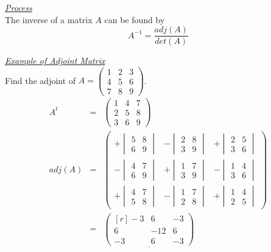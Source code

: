 \documentclass[11pt,a4paper]{article}
\begin{document}
\underline{\textit{Process}}\\
The inverse of a matrix $A$ can be found by
$$A^{-1} = \frac{adj(A)}{det(A)}$$

\textit{\underline{\textit{Example of Adjoint Matrix}}}\\
Find the adjoint of $A = \begin{pmatrix} 1 & 2 & 3 \\ 4 & 5 & 6 \\ 7 & 8 & 9 \end{pmatrix}$.
\[\begin{array}{rcl}
  A^t &=& \begin{pmatrix} 1 & 4 & 7 \\ 2 & 5 & 8 \\ 3 & 6 & 9\end{pmatrix}\\
  adj(A) &=& \begin{pmatrix} +\begin{vmatrix} 5 & 8 \\ 6 & 9 \end{vmatrix} & -\begin{vmatrix} 2 & 8 \\ 3 & 9 \end{vmatrix} & +\begin{vmatrix} 2 & 5 \\ 3 & 6 \end{vmatrix} \\ -\begin{vmatrix} 4 & 7 \\ 6 & 9 \end{vmatrix} & + \begin{vmatrix} 1 & 7 \\ 3 & 9\end{vmatrix} & -\begin{vmatrix} 1 & 4 \\ 3 & 6\end{vmatrix} \\ +\begin{vmatrix} 4 & 7 \\ 5 & 8 \end{vmatrix} & -\begin{vmatrix} 1 & 7 \\ 2 & 8 \end{vmatrix} & +\begin{vmatrix} 1 & 4 \\ 2 & 5 \end{vmatrix} \end{pmatrix}\\
  &=& \underline{\begin{pmatrix*}[r] -3 & 6 & -3 \\6 & -12 & 6 \\ -3 & 6 & -3 \end{pmatrix*}}
\end{array}\]
\end{document}
